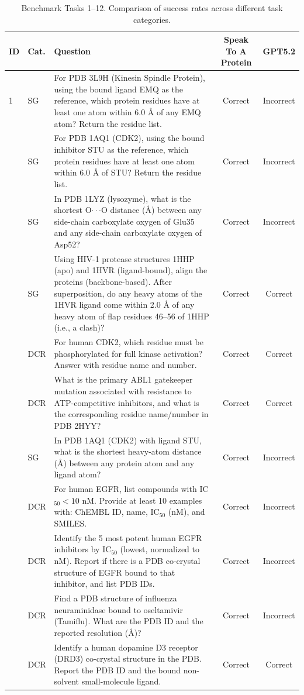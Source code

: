 \documentclass{article}
\begin{document}
\begin{table}[h]
\caption{Benchmark Tasks 1--12. Comparison of success rates across different task categories.}
\centering
\small
\begin{tabularx}{\textwidth}{p{0.4cm} p{0.6cm} X c c}
\toprule
\textbf{ID} & \textbf{Cat.} & \textbf{Question} & \textbf{Speak To A Protein} & \textbf{GPT5.2} \\
\midrule
1 & SG & For PDB 3L9H (Kinesin Spindle Protein), using the bound ligand EMQ as the reference, which protein residues have at least one atom within 6.0 \AA{} of any EMQ atom? Return the residue list. & Correct & Incorrect \\ \addlinespace
2 & SG & For PDB 1AQ1 (CDK2), using the bound inhibitor STU as the reference, which protein residues have at least one atom within 6.0 \AA{} of STU? Return the residue list. & Correct & Incorrect \\ \addlinespace
3 & SG & In PDB 1LYZ (lysozyme), what is the shortest O$\cdot\cdot\cdot$O distance (\AA{}) between any side-chain carboxylate oxygen of Glu35 and any side-chain carboxylate oxygen of Asp52? & Correct & Incorrect \\ \addlinespace
4 & SG & Using HIV-1 protease structures 1HHP (apo) and 1HVR (ligand-bound), align the proteins (backbone-based). After superposition, do any heavy atoms of the 1HVR ligand come within 2.0 \AA{} of any heavy atom of flap residues 46–56 of 1HHP (i.e., a clash)? & Correct & Correct \\ \addlinespace
5 & DCR & For human CDK2, which residue must be phosphorylated for full kinase activation? Answer with residue name and number. & Correct & Correct \\ \addlinespace
6 & DCR & What is the primary ABL1 gatekeeper mutation associated with resistance to ATP-competitive inhibitors, and what is the corresponding residue name/number in PDB 2HYY? & Correct & Correct \\ \addlinespace
7 & SG & In PDB 1AQ1 (CDK2) with ligand STU, what is the shortest heavy-atom distance (\AA{}) between any protein atom and any ligand atom? & Correct & Incorrect \\ \addlinespace
8 & DCR & For human EGFR, list compounds with IC$_{50} < 10$ nM. Provide at least 10 examples with: ChEMBL ID, name, IC$_{50}$ (nM), and SMILES. & Correct & Incorrect \\ \addlinespace
9 & DCR & Identify the 5 most potent human EGFR inhibitors by IC$_{50}$ (lowest, normalized to nM). Report if there is a PDB co-crystal structure of EGFR bound to that inhibitor, and list PDB IDs. & Correct & Incorrect \\ \addlinespace
10 & DCR & Find a PDB structure of influenza neuraminidase bound to oseltamivir (Tamiflu). What are the PDB ID and the reported resolution (\AA{})? & Correct & Incorrect \\ \addlinespace
11 & DCR & Identify a human dopamine D3 receptor (DRD3) co-crystal structure in the PDB. Report the PDB ID and the bound non-solvent small-molecule ligand. & Correct & Correct \\
\bottomrule
\end{tabularx}
\end{table}
\end{document}
